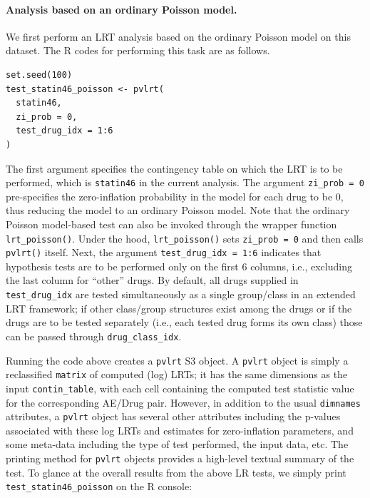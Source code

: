 \hypertarget{analysis-based-on-an-ordinary-poisson-model.}{%
\paragraph{Analysis based on an ordinary Poisson model.}\label{analysis-based-on-an-ordinary-poisson-model.}}

We first perform an LRT analysis based on the ordinary Poisson model on this dataset. The R codes for performing this task are as follows.

\begin{verbatim}
set.seed(100) 
test_statin46_poisson <- pvlrt(   
  statin46,   
  zi_prob = 0,   
  test_drug_idx = 1:6   
)
\end{verbatim}

The first argument specifies the contingency table on which the LRT is to be performed, which is \texttt{statin46} in the current analysis. The argument \texttt{zi\_prob\ =\ 0} pre-specifies the zero-inflation probability in the model for each drug to be 0, thus reducing the model to an ordinary Poisson model. Note that the ordinary Poisson model-based test can also be invoked through the wrapper function \texttt{lrt\_poisson()}. Under the hood, \texttt{lrt\_poisson()} sets \texttt{zi\_prob\ =\ 0} and then calls \texttt{pvlrt()} itself. Next, the argument \texttt{test\_drug\_idx\ =\ 1:6} indicates that hypothesis tests are to be performed only on the first 6 columns, i.e., excluding the last column for ``other'' drugs. By default, all drugs supplied in \texttt{test\_drug\_idx} are tested simultaneously as a single group/class in an extended LRT framework; if other class/group structures exist among the drugs or if the drugs are to be tested separately (i.e., each tested drug forms its own class) those can be passed through \texttt{drug\_class\_idx}.

Running the code above creates a \texttt{pvlrt} S3 object. A \texttt{pvlrt} object is simply a reclassified \texttt{matrix} of computed (log) LRTs; it has the same dimensions as the input \texttt{contin\_table}, with each cell containing the computed test statistic value for the corresponding AE/Drug pair. However, in addition to the usual \texttt{dimnames} attributes, a \texttt{pvlrt} object has several other attributes including the p-values associated with these log LRTs and estimates for zero-inflation parameters, and some meta-data including the type of test performed, the input data, etc. The printing method for \texttt{pvlrt} objects provides a high-level textual summary of the test. To glance at the overall results from the above LR tests, we simply print \texttt{test\_statin46\_poisson} on the R console:

